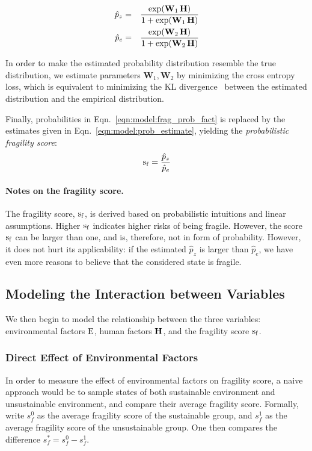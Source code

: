 \begin{eqnarray}
   \hat{p}_z & = & \frac{\exp(\mathbf{W}_1\operatorname*{\mathbf{H}})}{1+\exp(\mathbf{W}_1\operatorname*{\mathbf{H}})} \nonumber \\
   \hat{p}_e & = & \frac{\exp(\mathbf{W}_2\operatorname*{\mathbf{H}})}{1+\exp(\mathbf{W}_2\operatorname*{\mathbf{H}})}
   \label{eqn:model:prob_estimate}
\end{eqnarray}

In order to make the estimated probability distribution resemble the true distribution, we estimate parameters $\mathbf{W}_1, \mathbf{W}_2$ by minimizing the cross entropy loss, which is equivalent to minimizing the KL divergence~ between the estimated distribution and the empirical distribution. 

Finally, probabilities in Eqn.~\ref{eqn:model:frag_prob_fact} is replaced by the estimates given in Eqn.~\ref{eqn:model:prob_estimate}, yielding the \emph{probabilistic fragility score}:
\begin{equation}
  \label{eqn:model:frag_score}  
  \operatorname*{s_f} = \frac{\hat{p}_z}{\hat{p}_e}
\end{equation}

\paragraph{Notes on the fragility score.} The fragility score, $\operatorname*{s_f}$, is derived based on probabilistic intuitions and linear assumptions. Higher $\operatorname*{s_f}$ indicates higher risks of being fragile. However, the score $\operatorname*{s_f}$ can be larger than one, and is, therefore, not in form of probability. However, it does not hurt its applicability: if the estimated $\hat{p}_z$ is larger than $\hat{p}_e$, we have even more reasons to believe that the considered state is fragile. 

\subsection{Modeling the Interaction between Variables}
We then begin to model the relationship between the three variables: environmental factors $\operatorname*{E}$, human factors $\operatorname*{\mathbf{H}}$, and the fragility score $\operatorname*{s_f}$. 

\subsubsection{Direct Effect of Environmental Factors} In order to measure the effect of environmental factors on fragility score, a naive approach would be to sample states of both sustainable environment and unsustainable environment, and compare their average fragility score. Formally, write $s^0_f$ as the average fragility score of the sustainable group, and $s^1_f$ as the average fragility score of the unsustainable group. One then compares the difference $s^*_f=s^0_f - s^1_f$.

